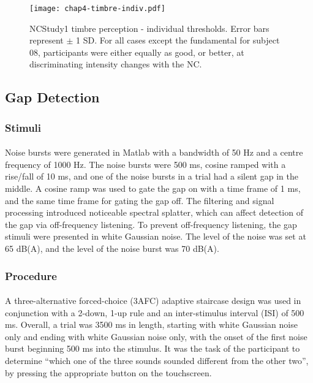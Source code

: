 \begin{figure}[htp]
\begin{center}
\texttt{[image: chap4-timbre-indiv.pdf]} \\
\caption[NCStudy1 timbre perception - individual thresholds]{NCStudy1 timbre perception - individual thresholds.  Error bars represent $\pm$ 1 SD.  For all cases except the fundamental for subject 08, participants were either equally as good, or better, at discriminating intensity changes with the NC.}
\label{ch4-timbre-indiv}
\end{center}
\end{figure}

\subsection{Gap Detection}
\subsubsection{Stimuli}
\paragraph{}Noise bursts were generated in Matlab with a bandwidth of 50 Hz and a centre frequency of 1000 Hz.  The noise bursts were 500 ms, cosine ramped with a rise/fall of 10 ms, and one of the noise bursts in a trial had a silent gap in the middle.  A cosine ramp was used to gate the gap on with a time frame of 1 ms, and the same time frame for gating the gap off.  The filtering and signal processing introduced noticeable spectral splatter, which can affect detection of the gap via off-frequency listening.  To prevent off-frequency listening, the gap stimuli were presented in white Gaussian noise.  The level of the noise was set at 65 dB(A), and the level of the noise burst was 70 dB(A).
\subsubsection{Procedure}
\paragraph{}A three-alternative forced-choice (3AFC) adaptive staircase design \cite{Levitt1971} was used in conjunction with a 2-down, 1-up rule and an inter-stimulus interval (ISI) of 500 ms.  Overall, a trial was 3500 ms in length, starting with white Gaussian noise only and ending with white Gaussian noise only, with the onset of the first noise burst beginning 500 ms into the stimulus.  It was the task of the participant to determine ``which one of the three sounds sounded different from the other two'', by pressing the appropriate button on the touchscreen.

